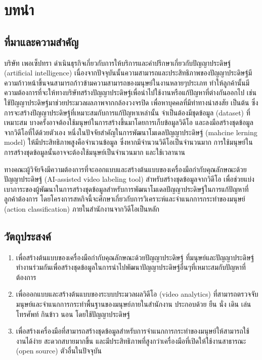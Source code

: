 \chapter{บทนำ}
\section{ที่มาและความสำคัญ}
บริษัท เพอเซ็ปทรา ดำเนินธุรกิจเกี่ยวกับการให้บริการและคำปรึกษาเกี่ยวกับปัญญาประดิษฐ์ (artificial intelligence)
เนื่องจากปัจจุบันนั้นความสามารถและประสิทธิภาพของปัญญาประดิษฐ์มีความก้าวหน้าขึ้นจนสามารถก้าวข้ามความสามารถของมนุษย์ในงานหลายๆประเภท
ทำให้ลูกค้านั้นมีความต้องการที่จะให้ทางบริษัทสร้างปัญญาประดิษฐ์เพื่อนำไปใช้งานหรือแก้ปัญหาที่ต่างกันออกไป เช่น ใช้ปัญญาประดิษฐ์มาช่วยประมวลผลภาพจากกล้องวงจรปิด เพื่อหาบุคคลที่มีท่าทางน่าสงสัย เป็นต้น
ซึ่งการจะสร้างปัญญาประดิษฐ์ที่เหมาะสมกับการแก้ปัญหาเหล่านั้น จำเป็นต้องมีชุดข้อมูล (dataset) ที่เหมาะสม บางครั้งอาจต้องใช้มนุษย์ในการสร้างขึ้นมาโดยการเก็บข้อมูลวิดีโอ 
และลงมือสร้างชุดข้อมูลจากวิดีโอที่ได้ด้วยตัวเอง หนึ่งในปัจจัยสำคัญในการพัฒนาโมเดลปัญญาประดิษฐ์ (mahcine lerning model) ให้มีประสิทธิภาพสูงคือจำนวนข้อมูล
ซึ่งหากมีจำนวนวิดีโอเป็นจำนวนมาก การใช้มนุษย์ในการสร้างชุดข้อมูลนั้นอาจจะต้องใช้มนุษย์เป็นจำนวนมาก และใช้เวลานาน 

ทางคณะผู้วิจัยจึงมีความต้องการที่จะออกแบบและสร้างต้นแบบของเครื่องมือกำกับคุณลักษณะด้วยปัญญาประดิษฐ์ (AI-assisted video labeling tool) สำหรับสร้างชุดข้อมูลจากวิดีโอ 
เพื่อช่วยแบ่งเบาภาระของผู้พัฒนาในการสร้างชุดข้อมูลสำหรับการพัฒนาโมเดลปัญญาประดิษฐ์ในการแก้ปัญหาที่ลูกค้าต้องการ 
โดยโครงการสหกิจนี้จะศึกษาเกี่ยวกับการวิเคราะห์และจำแนกการกระทำของมนุษย์ (action classification) ภายในสำนักงานจากวิดีโอเป็นหลัก

\section{วัตถุประสงค์}
\begin{enumerate}
	\setlength\itemsep{-0.25em}
	\item เพื่อสร้างต้นแบบของเครื่องมือกำกับคุณลักษณะด้วยปัญญาประดิษฐ์ ที่มนุษย์และปัญญาประดิษฐ์ทำงานร่วมกันเพื่อสร้างชุดข้อมูลในการนำไปพัฒนาปัญญาประดิษฐ์อื่นๆที่เหมาะสมกับปัญหาที่ต้องการ
	\item เพื่อออกแบบและสร้างต้นแบบของระบบประมวลผลวิดีโอ (video analytics) ที่สามารถตรวจจับมนุษย์และจำแนกการกระทำพื้นฐานของมนุษย์ภายในสำนักงาน ประกอบด้วย ยืน นั่ง เดิน เล่นโทรศัพท์ กินข้าว นอน โดยใช้ปัญญาประดิษฐ์
	\item เพื่อสร้างเครื่องมือที่สามารถสร้างชุดข้อมูลสำหรับการจำแนกการกระทำของมนุษย์ให้สามารถใช้งานได้ง่าย สะดวกสบายมากขึ้น และมีประสิทธิภาพที่สูงกว่าเครื่องมือที่เปิดให้ใช้งานสาธารณะ (open source) ตัวอื่นในปัจจุบัน
\end{enumerate}

